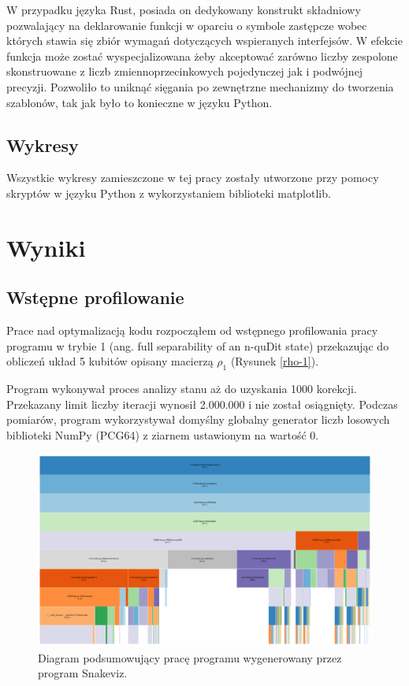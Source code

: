 \documentclass[11pt, a4paper]{article}
\begin{document}
\begin{sloppypar}
    W przypadku języka Rust, posiada on dedykowany konstrukt składniowy pozwalający na deklarowanie
    funkcji w oparciu o symbole zastępcze wobec których stawia się zbiór wymagań dotyczących
    wspieranych interfejsów. W efekcie funkcja może zostać wyspecjalizowana żeby
    akceptować zarówno liczby zespolone skonstruowane z liczb zmiennoprzecinkowych
    pojedynczej jak i podwójnej precyzji. Pozwoliło to uniknąć sięgania po zewnętrzne mechanizmy
    do tworzenia szablonów, tak jak było to konieczne w języku Python.

    \subsection{Wykresy}
    Wszystkie wykresy zamieszczone w tej pracy zostały utworzone przy pomocy skryptów w
    języku Python z wykorzystaniem biblioteki matplotlib\cite{Hunter:2007}.

    \section{Wyniki}
    \subsection{Wstępne profilowanie}
    Prace nad optymalizacją kodu rozpocząłem od wstępnego profilowania pracy programu w trybie
    1 (ang. full separability of an n-quDit state) przekazując do obliczeń układ 5
    kubitów opisany macierzą $\rho_{1}$ (Rysunek \ref{rho-1}).

    Program wykonywał proces analizy stanu aż do uzyskania 1000 korekcji. Przekazany limit
    liczby iteracji wynosił 2.000.000 i nie został osiągnięty. Podczas pomiarów, program
    wykorzystywał domyślny globalny generator liczb losowych biblioteki NumPy (PCG64\cite{NumpyDefaultGenerator})
    z ziarnem ustawionym na wartość 0.

    \FloatBarrier
    \begin{figure}[ht]
      \centering
      \includegraphics[width=1.0\textwidth]{"resources/profiling_1/graph.png"}
      \caption{Diagram podsumowujący pracę programu wygenerowany przez program Snakeviz.}
      \label{pre-prof-perf}
    \end{figure}
    \FloatBarrier


\end{sloppypar}
\end{document}
